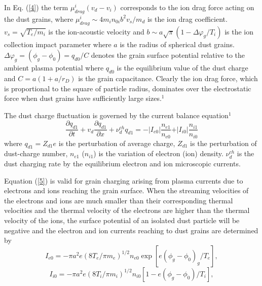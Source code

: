 In Eq. (\ref{4}) the term $\mu_{drag}^{i}(v_{d}-v_{i})$ corresponds
to the ion drag force acting on the dust grains, where
$\mu_{drag}^{i}\sim4m_{i}n_{0i}b^{2}v_{s}/m_{d}$ is the ion drag
coefficient. $v_{s}=\sqrt{T_{e}/m_{i}}$ is the ion-acoustic velocity
and $b\sim a\sqrt{\pi}(1-\Delta \varphi_{g}/T_{i})$ is the ion
collection impact parameter where $a$ is the radius of spherical
dust grains. $\Delta \varphi_{g}=(\phi_{g}-\phi_{0})=q_{d0}/C$
denotes the grain surface potential relative to the ambient plasma
potential where $q_{d0}$ is the equilibrium value of the dust charge
and $C=a(1+a/r_{D})$ is the grain capacitance. Clearly the ion drag
force, which is proportional to the square of particle radius,
dominates over the electrostatic force when dust grains have
sufficiently large sizes.$^1$


The dust charge fluctuation is governed by the current balance
equation$^{1}$
\begin{equation}\label{5}
\frac{\partial {q}_{d1}}{\partial t}+v_{d}\frac{\partial {q}_{d1}}{\partial x}
+\nu_{d}^{ch}{q}_{d1}=-\vert I_{e0}\vert \frac{{n}_{e1}}{n_{e0}}
+\vert I_{i0}\vert\frac{{n}_{i1}}{n_{i0}}
\end{equation}
where ${q}_{d1}=Z_{d1}e$ is the perturbation of average charge,
$Z_{d1}$ is the perturbation of dust-charge number, ${n}_{e1}$
(${n}_{i1}$) is the variation of electron (ion) density.
$\nu_{d}^{ch}$ is the dust charging rate by the equilibrium electron
and ion microscopic currents.

Equation (\ref{5}) is valid for grain charging arising from plasma
currents due to electrons and ions reaching the grain surface. When
the streaming velocities of the electrons and ions are much smaller
than their corresponding thermal velocities and the thermal velocity
of the electrons are higher than the thermal velocity of the ions,
the surface potential of an isolated dust particle will be negative
and the electron and ion currents reaching to dust grains are
determined by
\begin{equation}\label{6}
I_{e0}=-\pi a^{2}e(8T_{e}/\pi m_{e})^{1/2}n_{e0}\exp \left[ e(\phi_{g}-\phi_{0})_{g}/T_{e}\right] ,
\end{equation}
\begin{equation}\label{7}
I_{i0}=-\pi a^{2}e(8T_{i}/\pi m_{i})^{1/2}n_{i0}\left[ 1-e(\phi_{g}-\phi_{0})/T_{i}\right] ,
\end{equation}

